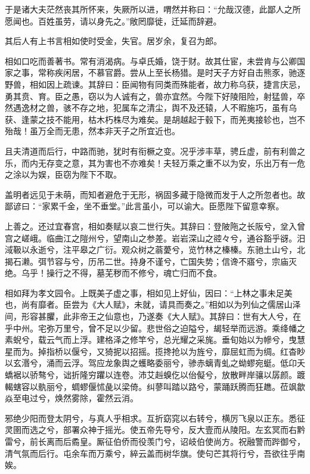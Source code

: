 \documentclass[12pt,UTF8]{ctexbook}
\begin{document}
于是诸大夫茫然丧其所怀来，失厥所以进，喟然并称曰：“允哉汉德，此鄙人之所愿闻也。百姓虽劳，请以身先之。”敞罔靡徙，迁延而辞避。



其后人有上书言相如使时受金，失官。居岁余，复召为郎。



相如口吃而善著书。常有消渴病。与卓氏婚，饶于财。故其仕宦，未尝肯与公卿国家之事，常称疾闲居，不慕官爵。尝从上至长杨猎。是时天子方好自击熊豕，驰逐野兽，相如因上疏谏。其辞曰：臣闻物有同类而殊能者，故力称乌获，捷言庆忌，勇其贲、育。臣之愚，窃以为人诚有之，兽亦宜然。今陛下好陵阻险，射猛兽，卒然遇逸材之兽，骇不存之地，犯属车之清尘，舆不及还辕，人不暇施巧，虽有乌获、逢蒙之技不能用，枯木朽株尽为难矣。是胡越起于毂下，而羌夷接轸也，岂不殆哉！虽万全而无患，然本非天子之所宜近也。



且夫清道而后行，中路而驰，犹时有衔橛之变。况乎涉丰草，骋丘虚，前有利兽之乐，而内无存变之意，其为害也不亦难矣！夫轻万乘之重不以为安，乐出万有一危之涂以为娱，臣窃为陛下不取。



盖明者远见于未萌，而知者避危于无形，祸固多藏于隐微而发于人之所忽者也。故鄙谚曰：“家累千金，坐不垂堂。”此言虽小，可以谕大。臣愿陛下留意幸察。



上善之。还过宜春宫，相如奏赋以哀二世行失。其辞曰：登陂陁之长阪兮，坌入曾宫之嵯峨。临曲江之隑州兮，望南山之参差。岩岩深山之谾々兮，通谷豁乎谺。汨淢靸以永逝兮，注平皋之广衍。观众树之蓊薆兮，览竹林之榛榛。东驰土山兮，北揭石濑。弭节容与兮，历吊二世。持身不谨兮，亡国失势；信谗不寤兮，宗庙灭绝。乌乎！操行之不得，墓芜秽而不修兮，魂亡归而不食。



相如拜为孝文园令。上既美子虚之事，相如见上好仙，因曰：“上林之事未足美也，尚有靡者。臣尝为《大人赋》，未就，请具而奏之。”相如以为列仙之儒居山泽间，形容甚臞，此非帝王之仙意也，乃遂奏《大人赋》。其辞曰：世有大人兮，在乎中州。宅弥万里兮，曾不足以少留。悲世俗之迫隘兮，朅轻举而远游。乘绛幡之素蜺兮，载云气而上浮。建格泽之修竿兮，总光耀之采旄。垂旬始以为幓兮，曳慧星而为。掉指桥以偃兮，又猗抳以招摇。揽搀抢以为旌兮，靡屈虹而为绸。红杳眇以玄湣兮，涌而云浮。驾应龙象舆之蠖略委丽兮，骖赤螭青虬之蚴蟉宛蜓。低卬夭蟜裾以骄骜兮，诎折隆穷躣以连卷。沛艾赳螑仡以佁儗兮，放散畔岸骧以孱颜。踱輵螛容以骫丽兮，蜩蟉偃怵彘以梁倚。纠蓼叫踏以路兮，蒙踊跃腾而狂趭。莅飒歙焱至电过兮，焕然雾除，霍然云消。



邪绝少阳而登太阴兮，与真人乎相求。互折窈窕以右转兮，横厉飞泉以正东。悉征灵圉而选之兮，部署众神于摇光。使五帝先导兮，反大壹而从陵阳。左玄冥而右黔雷兮，前长离而后矞皇。厮征伯侨而役羡门兮，诏岐伯使尚方。祝融警而跸御兮，清气氛而后行。屯余车而万乘兮，綷云盖而树华旗。使句芒其将行兮，吾欲往乎南娭。
\end{document}
